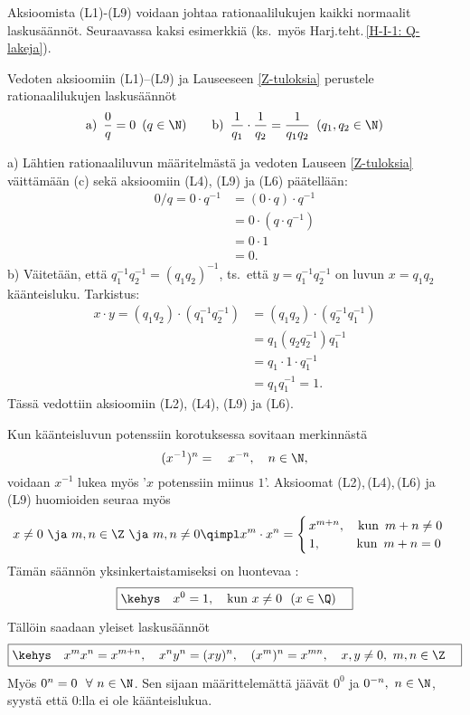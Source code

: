 Aksioomista (L1)-(L9) voidaan johtaa rationaalilukujen kaikki normaalit laskusäännöt. Seuraavassa
kaksi esimerkkiä (ks.\ myös Harj.teht.\,\ref{H-I-1: Q-lakeja}).
\begin{Exa} \label{kaksi Q-lakia}
Vedoten aksioomiin (L1)--(L9) ja Lauseeseen \ref{Z-tuloksia} perustele rationaalilukujen
laskusäännöt
\[
\text{a)}\,\ \frac{0}{q}=0\,\ (q\in\N) \qquad 
\text{b)}\,\ \frac{1}{q_1}\cdot\frac{1}{q_2} = \frac{1}{q_1q_2}\,\ (q_1,q_2\in\N)
\]
\end{Exa}
\ratk a) Lähtien rationaaliluvun määritelmästä ja vedoten Lauseen \ref{Z-tuloksia}
väittämään (c) sekä aksioomiin (L4), (L9) ja (L6) päätellään:
\begin{align*}
0/q = 0 \cdot q^{-1} &= (0 \cdot q)\cdot q^{-1} \\
                     &= 0\cdot(q \cdot q^{-1}) \\
                     &= 0 \cdot 1 \\
                     &= 0.
\end{align*}
b) Väitetään, että $q_1^{-1}q_2^{-1}=(q_1q_2)^{-1}$, ts.\ että $y=q_1^{-1}q_2^{-1}$ on luvun
$x=q_1q_2$ käänteisluku. Tarkistus:
\begin{align*}
x \cdot y = (q_1q_2)\cdot(q_1^{-1}q_2^{-1}) &= (q_1q_2)\cdot(q_2^{-1}q_1^{-1}) \\
                                            &= q_1(q_2q_2^{-1})q_1^{-1} \\
                                            &= q_1 \cdot 1 \cdot q_1^{-1} \\
                                            &= q_1q_1^{-1} = 1. 
\end{align*}
Tässä vedottiin aksioomiin (L2), (L4), (L9) ja (L6). \loppu

Kun käänteisluvun potenssiin korotuksessa sovitaan merkinnästä
\[
(x^{-1})^n = \quad x^{-n}, \quad n \in \N,
\]
voidaan $x^{-1}$ lukea myös '$x$ potenssiin miinus $1$'. Aksioomat (L2),\,(L4),\,(L6) ja (L9)
huomioiden seuraa myös 
\[
x \neq 0\ \ja\ m,n \in \Z\ \ja\ m,n \neq 0 
                         \qimpl x^m \cdot x^n = \begin{cases}
                                                \,x^{m+n}, \quad \text{kun}\,\ m+n \neq 0 \\
                                                \,1, \quad\quad\,\ \ \text{kun}\,\ m+n = 0
                                                \end{cases}
\]
Tämän säännön yksinkertaistamiseksi on luontevaa :
\[
\boxed{\kehys\quad x^0 = 1, \quad \text{kun}\ x \neq 0\ \ (x\in\Q) \quad }
\]
Tällöin saadaan yleiset laskusäännöt
\[
\boxed{\kehys \quad x^mx^n=x^{m+n}, \quad x^ny^n=(xy)^n, \quad (x^m)^n=x^{mn}, 
                                                         \quad x,y \neq 0,\ m,n\in\Z \quad} 
\]
Myös $0^n = 0 \ \ \forall\ n \in \N$. Sen sijaan määrittelemättä jäävät $0^0$ ja 
$0^{-n},\ n \in \N$, syystä että $0$:lla ei ole käänteislukua. 

